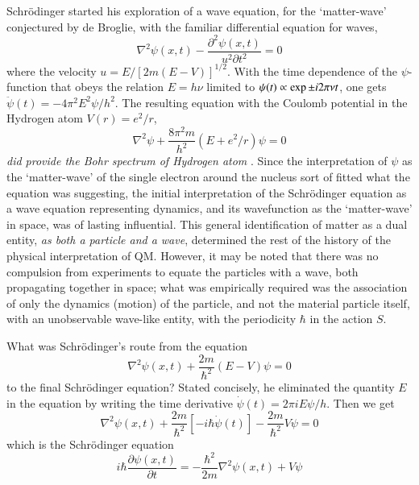 Schr\"{o}dinger started his exploration of a wave equation, for the `matter-wave' conjectured
by de Broglie, with the familiar differential equation for waves,
\begin{equation*}
\nabla^2 \psi (x,t) - \frac{\partial^2 \psi (x,t)}{u^2 \partial t^2} = 0 \tag{2}\label{c14-eq2}
\end{equation*}
where the velocity $u = E/ [2m(E - V )]^{1/2}$. With the time dependence of the $\psi$-function
that obeys the relation $E = h\nu$ limited to $\psi(t)  \propto  \exp\break \pm i2\pi \nu t$, one gets $\ddot{\psi} (t) = -4 \pi^2 E^2 \psi /h^2$.
The resulting equation with the Coulomb potential in the Hydrogen atom $V (r) = e^2 /r$,
\begin{equation*}
\nabla^2 \psi + \frac{8 \pi^2 m}{h^2} (E + e^2 / r) \psi = 0 \tag{3}\label{c14-eq3}
\end{equation*}
\textit{did provide the Bohr spectrum of Hydrogen atom} \cite{chap14-key1}. Since the interpretation of $\psi$ as the
`matter-wave' of the single electron around the nucleus sort of fitted what the equation was
suggesting, the initial interpretation of the Schr\"{o}dinger equation as a wave equation 
representing dynamics, and its wavefunction as the `matter-wave' in space, was of lasting influential.
This general identification of matter as a dual entity, \textit{as both a particle and a wave}, determined the rest of the history of the physical interpretation of QM. However, it may be noted that there was no compulsion from experiments to equate the particles with a wave,
both propagating together in space; what was empirically required was the association of only the
dynamics (motion) of the particle, and not the material particle itself, with an unobservable
wave-like entity, with the periodicity $\hbar$ in the action $S$.

What was Schr\"{o}dinger's route from the equation
\begin{equation*}
\nabla^2 \psi(x,t) + \frac{2m}{\hbar^2} (E-V) \psi = 0 \tag{4}\label{c14-eq4}
\end{equation*}
to the final Schr\"{o}dinger equation? Stated concisely, he eliminated the quantity $E$ in the
equation by writing the time derivative $\dot{\psi}(t) = 2\pi i E \psi /h$. Then we get
\begin{equation*}
\nabla^2 \psi (x,t)  + \frac{2m}{\hbar^2} [-i \hbar \dot{\psi} (t)] - \frac{2m}{\hbar^2} V\psi = 0 \tag{5}\label{c14-eq5}
\end{equation*}
which is the Schr\"{o}dinger equation
\begin{equation*}
i \hbar \frac{\partial \psi (x,t)}{\partial t} = - \frac{\hbar^2}{2m} \nabla^2 \psi (x,t) + V \psi  \tag{6}\label{c14-eq6}
\end{equation*}

